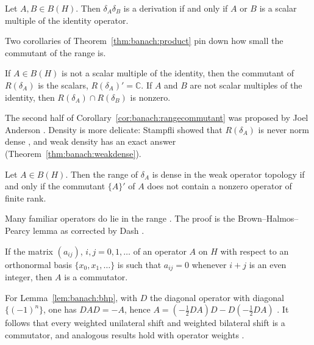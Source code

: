\begin{theorem}\label{thm:banach:product}
Let $A,B\in B(H)$. Then $\delta_A\delta_B$ is a derivation if and only if
$A$ or $B$ is a scalar multiple of the identity operator.
\end{theorem}

Two corollaries of Theorem~\ref{thm:banach:product} pin down how small the
commutant of the range is.

\begin{corollary}\label{cor:banach:rangecommutant}
If $A\in B(H)$ is not a scalar multiple of the identity, then the
commutant of $R(\delta_A)$ is the scalars, $R(\delta_A)'=\mathbb{C}$. If
$A$ and $B$ are not scalar multiples of the identity, then
$R(\delta_A)\cap R(\delta_B)$ is nonzero.
\end{corollary}

The second half of Corollary~\ref{cor:banach:rangecommutant} was proposed by
Joel Anderson \cite[p.~275]{WilliamsJP1971Range}. Density is more delicate:
Stampfli showed that $R(\delta_A)$ is never norm dense
\cite[p.~275]{WilliamsJP1971Range}, and weak density has an exact answer
(Theorem~\ref{thm:banach:weakdense}).

\begin{theorem}\label{thm:banach:weakdense}
Let $A\in B(H)$. Then the range of $\delta_A$ is dense in the weak
operator topology if and only if the commutant $\{A\}'$ of $A$ does not
contain a nonzero operator of finite rank.
\end{theorem}

Many familiar operators do lie in the range
\cite[p.~495]{Dash1975BHP}. The proof is the Brown--Halmos--Pearcy lemma
as corrected by Dash \cite[p.~495]{Dash1975BHP}.

\begin{lemma}\label{lem:banach:bhp}
If the matrix $(a_{ij})$, $i,j=0,1,\dots$ of an operator $A$ on $H$ with
respect to an orthonormal basis $\{x_0,x_1,\dots\}$ is such that
$a_{ij}=0$ whenever $i+j$ is an even integer, then $A$ is a commutator.
\end{lemma}

For Lemma~\ref{lem:banach:bhp}, with $D$ the diagonal operator with
diagonal $\{(-1)^n\}$, one has $DAD=-A$, hence $A=(-\tfrac12 DA)D -
D(-\tfrac12 DA)$ \cite[p.~495]{Dash1975BHP}. It follows that every
weighted unilateral shift and weighted bilateral shift is a commutator,
and analogous results hold with operator weights
\cite[p.~495]{Dash1975BHP}.

